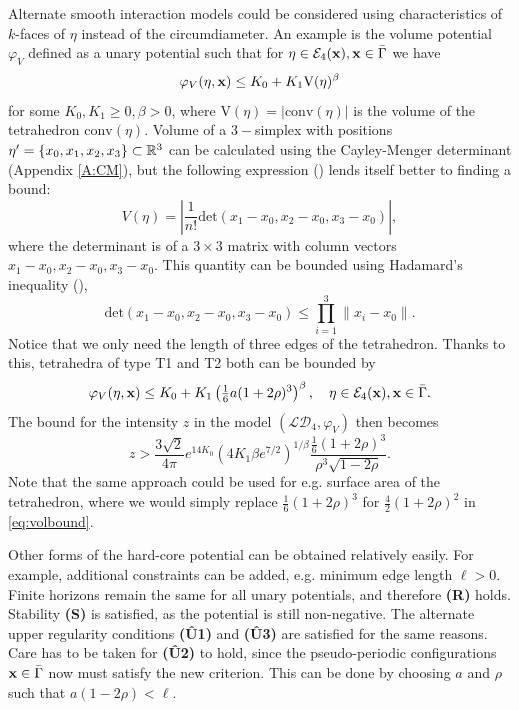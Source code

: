 \begin{remark}\label{r:otherpotentials}
	
	Alternate smooth interaction models could be considered using characteristics of $k$-faces of $\eta$ instead of the circumdiameter. An example is the volume potential $\varphi_{V}$ defined as a unary potential such that for $\eta\in\mathcal E_4({\mathbf{x}}), {\mathbf{x}} \in \bar\Gamma$  we have
	$$\varphi_{V}(\eta,{\mathbf{x}}) \leq K_0 + K_1 \mathrm{V}(\eta)^{\beta}$$
	for some $K_0,K_1 \geq 0, \beta >0$, where $\mathrm{V}(\eta)=|\mathrm{conv}(\eta)|$ is the volume of the tetrahedron $\mathrm{conv}(\eta)$. Volume of a $3-$simplex with positions $\eta'=\{x_0,x_1,x_2,x_3\}\subset {\mathbb R^3}$ can be calculated using the Cayley-Menger determinant (Appendix \ref{A:CM}), but the following expression (\cite{Stein1966}) lends itself better to finding a bound: 
	$$V(\eta)=\left| \frac 1{n!} \mathrm{det}(x_1-x_0,x_2-x_0,x_3-x_0) \right|,$$
	where the determinant is of a $3 \times 3$ matrix with column vectors $x_1-x_0,x_2-x_0,x_3-x_0$. This quantity can be bounded using Hadamard's inequality (\cite{Hadamard1893}),
	$$\mathrm{det}(x_1-x_0,x_2-x_0,x_3-x_0) \leq \prod^3_{i=1} \|x_i - x_0\| .$$
	Notice that we only need the length of three edges of the tetrahedron. Thanks to this, tetrahedra of type T1 and T2 both can be bounded by
	$$\varphi_V(\eta,{\mathbf{x}}) \leq K_0 + K_1 \left(\tfrac 16 a(1+2\rho)^3\right)^{\beta}, \quad \eta\in\mathcal E_4({\mathbf{x}}), {\mathbf{x}}\in \bar \Gamma.$$
	The bound for the intensity $z$ in the model $(\mathcal {LD}_4, \varphi_V)$ then becomes
	\begin{equation}\label{eq:volbound}z> \frac{3\sqrt 2}{4\pi}e^{14 K_0}   (4K_1 \beta e^{7/2})^{1/\beta} \frac{\frac 16 (1+2\rho)^3}{\rho^3 \sqrt{1-2\rho}}.\end{equation}
	Note that the same approach could be used for e.g. surface area of the tetrahedron, where we would simply replace $\tfrac 16 (1+2\rho)^3$ for $\tfrac 42 (1+2\rho)^2$ in \eqref{eq:volbound}.  \newline

\end{remark}


\begin{remark}
	Other forms of the hard-core potential can be obtained relatively easily. For example, additional constraints can be added, e.g. minimum edge length $\ell>0$. Finite horizons remain the same for all unary potentials, and therefore \textbf{(R)} holds. Stability \textbf{(S)} is satisfied, as the potential is still non-negative. The alternate upper regularity conditions \textbf{(\^{U}1)} and \textbf{(\^{U}3)} are satisfied for the same reasons. Care has to be taken for \textbf{(\^{U}2)} to hold, since the pseudo-periodic configurations ${\mathbf{x}}\in\bar \Gamma$ now must satisfy the new criterion. This can be done by choosing $a$ and $\rho$ such that $a(1-2\rho) < \ell$.
\end{remark}

